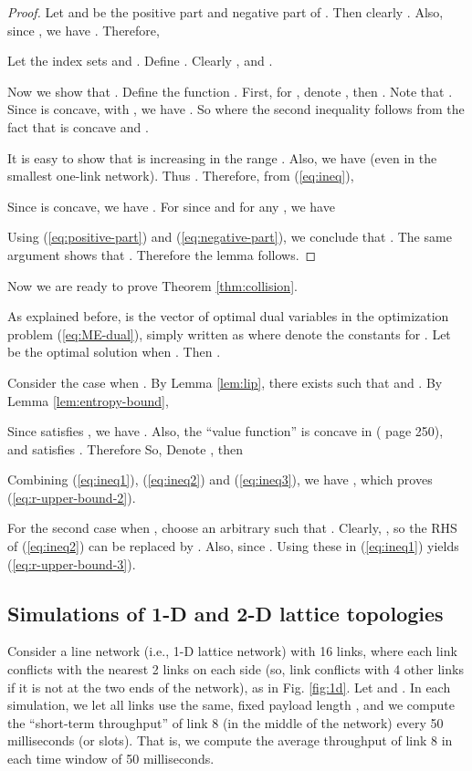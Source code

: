 \documentclass{IEEEtran}
\begin{document}
\begin{proof}
Let  and 
be the positive part and negative part of .
Then clearly .
Also, since , we have
.
Therefore, 


Let the index sets 
and .
Define . Clearly ,
and . 

Now we show that .
Define the function . First, for ,
denote , then .
Note that . Since  is
concave, with , we have .
So
where the second inequality follows from the fact that  is
concave and .

It is easy to show that  is increasing in the range .
Also, we have  (even in the smallest one-link network). Thus
.
Therefore, from (\ref{eq:ineq}),


Since  is concave, we have .
For  since  and 
for any , we have 


Using (\ref{eq:positive-part}) and (\ref{eq:negative-part}), we
conclude that .
The same argument shows that .
Therefore the lemma follows.
\end{proof}
Now we are ready to prove Theorem \ref{thm:collision}.

As explained before,  is the vector of
optimal dual variables in the optimization problem (\ref{eq:ME-dual}),
simply written as
where  denote the constants 
for . Let  be the optimal solution
when . Then . 

Consider the case when . By Lemma \ref{lem:lip},
there exists  such that 
and . By
Lemma \ref{lem:entropy-bound}, 


Since  satisfies ,
we have .
Also, the {}``value function''  is concave in
 (\cite{convex-book} page 250), and satisfies .
Therefore
So, 
Denote , then 


Combining (\ref{eq:ineq1}), (\ref{eq:ineq2}) and (\ref{eq:ineq3}),
we have ,
which proves (\ref{eq:r-upper-bound-2}).

For the second case when , choose an arbitrary 
such that . Clearly, ,
so the RHS of (\ref{eq:ineq2}) can be replaced by . Also, 
since . Using these in (\ref{eq:ineq1})
yields (\ref{eq:r-upper-bound-3}).


\subsection{Simulations of 1-D and 2-D lattice topologies}

Consider a line network (i.e., 1-D lattice network) with 16 links,
where each link conflicts with the nearest 2 links on each side (so,
link  conflicts with 4 other links if it is not at the two ends
of the network), as in Fig. \ref{fig:1d}. Let 
and . In each simulation, we let all links
use the same, fixed payload length , and we
compute the {}``short-term throughput'' of link 8 (in the middle
of the network) every 50 milliseconds (or  slots).
That is, we compute the average throughput of link 8 in each time
window of 50 milliseconds. 
\end{document}
